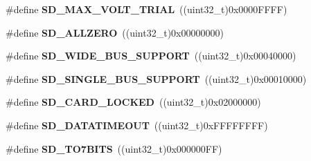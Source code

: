 \begin{DoxyCompactItemize}
\item 
\#define {\bfseries S\+D\+\_\+\+M\+A\+X\+\_\+\+V\+O\+L\+T\+\_\+\+T\+R\+I\+AL}~((uint32\+\_\+t)0x0000\+F\+F\+F\+F)\hypertarget{group___s_t_m324x_g___e_v_a_l___s_d_i_o___s_d___private___defines_ga8166660dfea1f2a865e30a8f86269b7f}{}\label{group___s_t_m324x_g___e_v_a_l___s_d_i_o___s_d___private___defines_ga8166660dfea1f2a865e30a8f86269b7f}

\item 
\#define {\bfseries S\+D\+\_\+\+A\+L\+L\+Z\+E\+RO}~((uint32\+\_\+t)0x00000000)\hypertarget{group___s_t_m324x_g___e_v_a_l___s_d_i_o___s_d___private___defines_gaa989d106109048a2fb453928325d1f7d}{}\label{group___s_t_m324x_g___e_v_a_l___s_d_i_o___s_d___private___defines_gaa989d106109048a2fb453928325d1f7d}

\item 
\#define {\bfseries S\+D\+\_\+\+W\+I\+D\+E\+\_\+\+B\+U\+S\+\_\+\+S\+U\+P\+P\+O\+RT}~((uint32\+\_\+t)0x00040000)\hypertarget{group___s_t_m324x_g___e_v_a_l___s_d_i_o___s_d___private___defines_ga6877313126588b7f2ce96f9b4d9a59b1}{}\label{group___s_t_m324x_g___e_v_a_l___s_d_i_o___s_d___private___defines_ga6877313126588b7f2ce96f9b4d9a59b1}

\item 
\#define {\bfseries S\+D\+\_\+\+S\+I\+N\+G\+L\+E\+\_\+\+B\+U\+S\+\_\+\+S\+U\+P\+P\+O\+RT}~((uint32\+\_\+t)0x00010000)\hypertarget{group___s_t_m324x_g___e_v_a_l___s_d_i_o___s_d___private___defines_gadfcb6043212373c69f3f740732f5d2b2}{}\label{group___s_t_m324x_g___e_v_a_l___s_d_i_o___s_d___private___defines_gadfcb6043212373c69f3f740732f5d2b2}

\item 
\#define {\bfseries S\+D\+\_\+\+C\+A\+R\+D\+\_\+\+L\+O\+C\+K\+ED}~((uint32\+\_\+t)0x02000000)\hypertarget{group___s_t_m324x_g___e_v_a_l___s_d_i_o___s_d___private___defines_ga0560d0e5f15b8c676bd1c53bf0ac381f}{}\label{group___s_t_m324x_g___e_v_a_l___s_d_i_o___s_d___private___defines_ga0560d0e5f15b8c676bd1c53bf0ac381f}

\item 
\#define {\bfseries S\+D\+\_\+\+D\+A\+T\+A\+T\+I\+M\+E\+O\+UT}~((uint32\+\_\+t)0x\+F\+F\+F\+F\+F\+F\+F\+F)\hypertarget{group___s_t_m324x_g___e_v_a_l___s_d_i_o___s_d___private___defines_ga9ca34cf6f4e38835347bc2dc29f9469e}{}\label{group___s_t_m324x_g___e_v_a_l___s_d_i_o___s_d___private___defines_ga9ca34cf6f4e38835347bc2dc29f9469e}

\item 
\#define {\bfseries S\+D\+\_\+T\+O7\+B\+I\+TS}~((uint32\+\_\+t)0x000000\+F\+F)\hypertarget{group___s_t_m324x_g___e_v_a_l___s_d_i_o___s_d___private___defines_ga37de3e6a7edfd787d09efddc589120ae}{}\label{group___s_t_m324x_g___e_v_a_l___s_d_i_o___s_d___private___defines_ga37de3e6a7edfd787d09efddc589120ae}


\end{DoxyCompactItemize}
